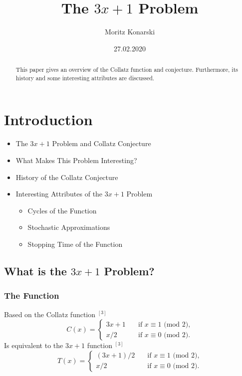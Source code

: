 \documentclass[12pt, a4paper, reqno]{amsart}
\title{The $3x+1$ Problem}
\author{Moritz Konarski}
\date{27.02.2020}
\begin{document}
\begin{abstract}
    This paper gives an overview of the Collatz function and conjecture.
    Furthermore, its history and some interesting attributes are discussed.
\end{abstract}

\maketitle
\tableofcontents

\section{Introduction}

\begin{itemize}
    \item The $3x+1$ Problem and Collatz Conjecture
    \item  What Makes This Problem Interesting?
    \item  History of the Collatz Conjecture
    \item  Interesting Attributes of the $3x+1$ Problem
    \begin{itemize}
        \item  Cycles of the Function
        \item  Stochastic Approximations
        \item  Stopping Time of the Function
    \end{itemize}
\end{itemize}

\subsection{What is the $3x+1$ Problem?}

\subsubsection{The Function}

Based on the Collatz function $^{[3]}$
\begin{equation}
C(x)= \left\{
    \begin{array}{ll}
        3x+1 \quad &\text{if } x \equiv 1 \text{ (mod 2),} \\
        x/2 \quad &\text{if } x \equiv 0 \text{ (mod 2).}
    \end{array}
\right.
\end{equation}
Is equivalent to the $3x+1$ function $^{[3]}$
\begin{equation}
T(x)= \left\{
    \begin{array}{ll}
        (3x+1)/2 \quad &\text{if } x \equiv 1 \text{ (mod 2),} \\
        x/2 \quad &\text{if } x \equiv 0 \text{ (mod 2).}
    \end{array}
\right.
\end{equation}
\end{document}

